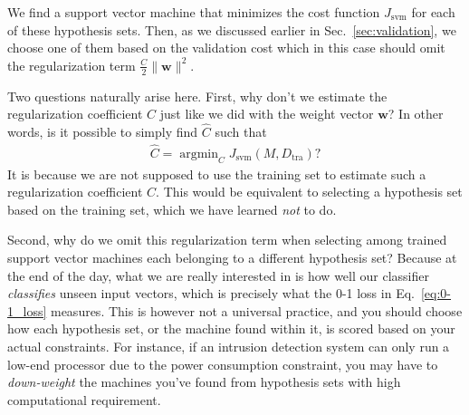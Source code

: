 \documentclass{report}
\newcommand{\vect}[1]{\mathbf{#1}}
\newcommand{\vw}[0]{\vect{w}}
\DeclareMathOperator*{\argmin}{\arg \min}
\newcommand{\tra}{\text{tra}}
\begin{document}
We find a support vector machine that minimizes the cost function
$J_{\text{svm}}$ for each of these hypothesis sets. Then, as we discussed
earlier in Sec.~\ref{sec:validation}, we choose one of them based on the
validation cost which in this case should omit the regularization term
$\frac{C}{2} \|\vw\|^2$. 

Two questions naturally arise here. First, why don't we estimate the
regularization coefficient $C$ just like we did with the weight vector $\vw$?
In other words, is it possible to simply find $\hat{C}$ such that 
\begin{align*}
    \hat{C} = \argmin_C J_{\text{svm}}(M, D_{\tra})?
\end{align*}
It is because we are not supposed to use the training set to estimate such a
regularization coefficient $C$. This would be equivalent to selecting a
hypothesis set based on the training set, which we have learned {\it not} to do.

Second, why do we omit this regularization term when selecting among trained
support vector machines each belonging to a different hypothesis set? Because at
the end of the day, what we are really interested in is how well our classifier
{\it classifies} unseen input vectors, which is precisely what the 0-1 loss in
Eq.~\eqref{eq:0-1_loss} measures. This is however not a universal practice, and
you should choose how each hypothesis set, or the machine found within it, is
scored based on your actual constraints. For instance, if an intrusion detection
system can only run a low-end processor due to the power consumption constraint,
you may have to {\it down-weight} the machines you've found from hypothesis sets
with high computational requirement. 
\end{document}
